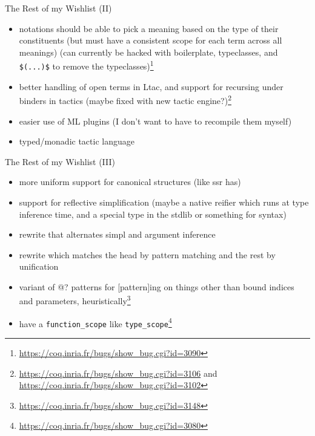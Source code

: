 \documentclass{beamer}
\begin{document}
\begin{frame}{The Rest of my Wishlist (II)}
\begin{itemize}
  \item
    notations should be able to pick a meaning based on the type of their constituents (but must have a consistent scope for each term across all meanings) (can currently be hacked with boilerplate, typeclasses, and \texttt{\$(...)\$} to remove the typeclasses)\footnote{\url{https://coq.inria.fr/bugs/show\_bug.cgi?id=3090}}
  \item 
    better handling of open terms in Ltac, and support for recursing under binders in tactics (maybe fixed with new tactic engine?)\footnote{\url{https://coq.inria.fr/bugs/show\_bug.cgi?id=3106} and \url{https://coq.inria.fr/bugs/show\_bug.cgi?id=3102}}
  \item 
    easier use of ML plugins (I don't want to have to recompile them myself)
  \item
    typed/monadic tactic language
\end{itemize}
\end{frame}

\begin{frame}{The Rest of my Wishlist (III)}
\begin{itemize}
  \item 
    more uniform support for canonical structures (like ssr has)
  \item 
    support for reflective simplification (maybe a native reifier which runs at type inference time, and a special type in the stdlib or something for syntax)
  \item 
    rewrite that alternates simpl and argument inference
  \item 
    rewrite which matches the head by pattern matching and the rest by unification
  \item 
    variant of @? patterns for [pattern]ing on things other than bound indices and parameters, heuristically\footnote{\url{https://coq.inria.fr/bugs/show\_bug.cgi?id=3148}}
  \item 
    have a \texttt{function\_scope} like \texttt{type\_scope}\footnote{\url{https://coq.inria.fr/bugs/show\_bug.cgi?id=3080}}
\end{itemize}
\end{frame}
\end{document}
